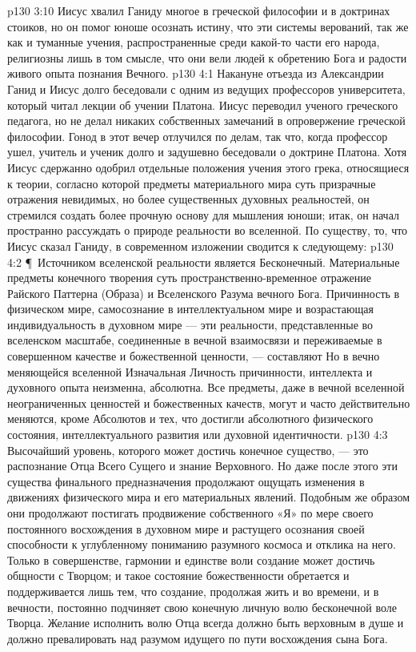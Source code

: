 \vs p130 3:10 Иисус хвалил Ганиду многое в греческой философии и в доктринах стоиков, но он помог юноше осознать истину, что эти системы верований, так же как и туманные учения, распространенные среди какой\hyp{}то части его народа, религиозны лишь в том смысле, что они вели людей к обретению Бога и радости живого опыта познания Вечного.
\vs p130 4:1 Накануне отъезда из Александрии Ганид и Иисус долго беседовали с одним из ведущих профессоров университета, который читал лекции об учении Платона. Иисус переводил ученого греческого педагога, но не делал никаких собственных замечаний в опровержение греческой философии. Гонод в этот вечер отлучился по делам, так что, когда профессор ушел, учитель и ученик долго и задушевно беседовали о доктрине Платона. Хотя Иисус сдержанно одобрил отдельные положения учения этого грека, относящиеся к теории, согласно которой предметы материального мира суть призрачные отражения невидимых, но более существенных духовных реальностей, он стремился создать более прочную основу для мышления юноши; итак, он начал пространно рассуждать о природе реальности во вселенной. По существу, то, что Иисус сказал Ганиду, в современном изложении сводится к следующему:
\vs p130 4:2 \P\ Источником вселенской реальности является Бесконечный. Материальные предметы конечного творения суть пространственно\hyp{}временное отражение Райского Паттерна (Образа) и Вселенского Разума вечного Бога. Причинность в физическом мире, самосознание в интеллектуальном мире и возрастающая индивидуальность в духовном мире --- эти реальности, представленные во вселенском масштабе, соединенные в вечной взаимосвязи и переживаемые в совершенном качестве и божественной ценности, --- составляют  Но в вечно меняющейся вселенной Изначальная Личность причинности, интеллекта и духовного опыта неизменна, абсолютна. Все предметы, даже в вечной вселенной неограниченных ценностей и божественных качеств, могут и часто действительно меняются, кроме Абсолютов и тех, что достигли абсолютного физического состояния, интеллектуального развития или духовной идентичности.
\vs p130 4:3 Высочайший уровень, которого может достичь конечное существо, --- это распознание Отца Всего Сущего и знание Верховного. Но даже после этого эти существа финального предназначения продолжают ощущать изменения в движениях физического мира и его материальных явлений. Подобным же образом они продолжают постигать продвижение собственного «Я» по мере своего постоянного восхождения в духовном мире и растущего осознания своей способности к углубленному пониманию разумного космоса и отклика на него. Только в совершенстве, гармонии и единстве воли создание может достичь общности с Творцом; и такое состояние божественности обретается и поддерживается лишь тем, что создание, продолжая жить и во времени, и в вечности, постоянно подчиняет свою конечную личную волю бесконечной воле Творца. Желание исполнить волю Отца всегда должно быть верховным в душе и должно превалировать над разумом идущего по пути восхождения сына Бога.
